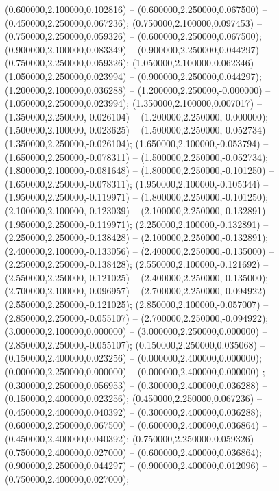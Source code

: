  (0.600000,2.100000,0.102816) -- (0.600000,2.250000,0.067500) -- (0.450000,2.250000,0.067236);
 (0.750000,2.100000,0.097453) -- (0.750000,2.250000,0.059326) -- (0.600000,2.250000,0.067500);
 (0.900000,2.100000,0.083349) -- (0.900000,2.250000,0.044297) -- (0.750000,2.250000,0.059326);
 (1.050000,2.100000,0.062346) -- (1.050000,2.250000,0.023994) -- (0.900000,2.250000,0.044297);
 (1.200000,2.100000,0.036288) -- (1.200000,2.250000,-0.000000) -- (1.050000,2.250000,0.023994);
 (1.350000,2.100000,0.007017) -- (1.350000,2.250000,-0.026104) -- (1.200000,2.250000,-0.000000);
 (1.500000,2.100000,-0.023625) -- (1.500000,2.250000,-0.052734) -- (1.350000,2.250000,-0.026104);
 (1.650000,2.100000,-0.053794) -- (1.650000,2.250000,-0.078311) -- (1.500000,2.250000,-0.052734);
 (1.800000,2.100000,-0.081648) -- (1.800000,2.250000,-0.101250) -- (1.650000,2.250000,-0.078311);
 (1.950000,2.100000,-0.105344) -- (1.950000,2.250000,-0.119971) -- (1.800000,2.250000,-0.101250);
 (2.100000,2.100000,-0.123039) -- (2.100000,2.250000,-0.132891) -- (1.950000,2.250000,-0.119971);
 (2.250000,2.100000,-0.132891) -- (2.250000,2.250000,-0.138428) -- (2.100000,2.250000,-0.132891);
 (2.400000,2.100000,-0.133056) -- (2.400000,2.250000,-0.135000) -- (2.250000,2.250000,-0.138428);
 (2.550000,2.100000,-0.121692) -- (2.550000,2.250000,-0.121025) -- (2.400000,2.250000,-0.135000);
 (2.700000,2.100000,-0.096957) -- (2.700000,2.250000,-0.094922) -- (2.550000,2.250000,-0.121025);
 (2.850000,2.100000,-0.057007) -- (2.850000,2.250000,-0.055107) -- (2.700000,2.250000,-0.094922);
 (3.000000,2.100000,0.000000) -- (3.000000,2.250000,0.000000) -- (2.850000,2.250000,-0.055107);
 (0.150000,2.250000,0.035068) -- (0.150000,2.400000,0.023256) -- (0.000000,2.400000,0.000000);
 (0.000000,2.250000,0.000000) -- (0.000000,2.400000,0.000000) ;
 (0.300000,2.250000,0.056953) -- (0.300000,2.400000,0.036288) -- (0.150000,2.400000,0.023256);
 (0.450000,2.250000,0.067236) -- (0.450000,2.400000,0.040392) -- (0.300000,2.400000,0.036288);
 (0.600000,2.250000,0.067500) -- (0.600000,2.400000,0.036864) -- (0.450000,2.400000,0.040392);
 (0.750000,2.250000,0.059326) -- (0.750000,2.400000,0.027000) -- (0.600000,2.400000,0.036864);
 (0.900000,2.250000,0.044297) -- (0.900000,2.400000,0.012096) -- (0.750000,2.400000,0.027000);
